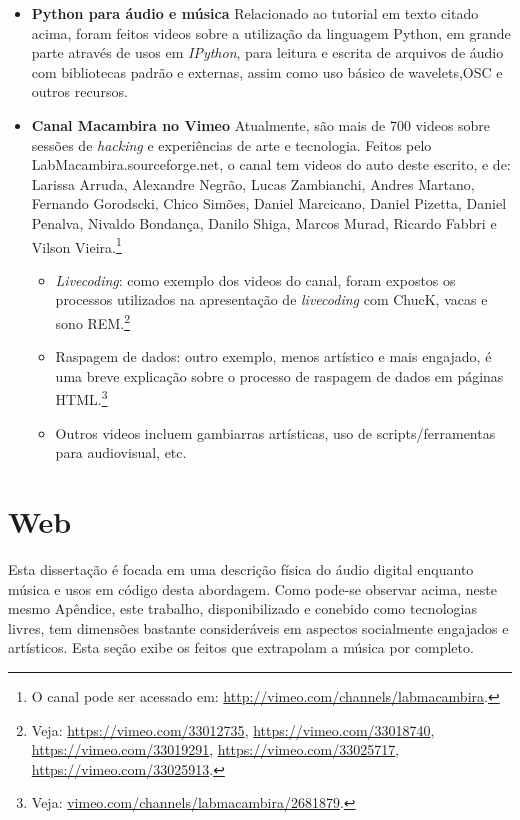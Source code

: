 \begin{itemize}
    \item {\bf Python para áudio e música}
    Relacionado ao tutorial em texto citado acima, foram feitos videos sobre a utilização da linguagem Python,
    em grande parte através de usos em \emph{IPython}, para leitura e escrita de arquivos de áudio com bibliotecas
    padrão e externas, assim como uso básico de wavelets,OSC e outros recursos.

    \item {\bf Canal Macambira no Vimeo}
    Atualmente, são mais de 700 videos sobre sessões de \emph{hacking} e experiências de arte
    e tecnologia. Feitos pelo LabMacambira.sourceforge.net, o canal tem videos do auto
    deste escrito, e de: Larissa Arruda, Alexandre Negrão, Lucas Zambianchi, Andres Martano,
    Fernando Gorodscki, Chico Simões, Daniel Marcicano, Daniel Pizetta, Daniel Penalva, Nivaldo Bondança,
    Danilo Shiga, Marcos Murad, Ricardo Fabbri e Vilson Vieira.\footnote{O canal pode ser acessado em:
    \url{http://vimeo.com/channels/labmacambira}.}
    \begin{itemize}
	    \item \emph{Livecoding}: como exemplo dos videos do canal, foram expostos os processos utilizados
        na apresentação de \emph{livecoding} com ChucK, vacas e sono REM.\footnote{Veja: \url{https://vimeo.com/33012735},
        \url{https://vimeo.com/33018740}, \url{https://vimeo.com/33019291}, \url{https://vimeo.com/33025717},
        \url{https://vimeo.com/33025913}.}

	    \item Raspagem de dados: outro exemplo, menos artístico e mais engajado, é uma breve explicação
        sobre o processo de raspagem de dados em páginas HTML.\footnote{Veja: \url{vimeo.com/channels/labmacambira/2681879}.}

        \item Outros videos incluem gambiarras artísticas, uso de scripts/ferramentas para audiovisual, etc.
    \end{itemize}
\end{itemize}





\section{Web}
Esta dissertação é focada em uma descrição física do áudio digital enquanto música e
usos em código desta abordagem. Como pode-se observar acima, neste mesmo Apêndice, este trabalho, disponibilizado e conebido como tecnologias livres, tem dimensões bastante consideráveis em aspectos socialmente engajados e artísticos. Esta seção exibe os feitos que extrapolam a música por completo.

